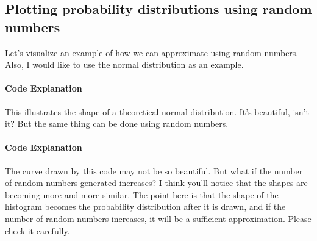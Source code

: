 \documentclass{ltjsbook}
\begin{document}
\subsection{Plotting probability distributions using random numbers}
Let's visualize an example of how we can approximate using random numbers. Also, I would like to use the normal distribution as an example.

\paragraph{Code Explanation}

This illustrates the shape of a theoretical normal distribution. It's beautiful, isn't it? But the same thing can be done using random numbers.


\paragraph{Code Explanation}

The curve drawn by this code may not be so beautiful. But what if the number of random numbers generated increases? I think you'll notice that the shapes are becoming more and more similar.
The point here is that the shape of the histogram becomes the probability distribution after it is drawn, and if the number of random numbers increases, it will be a sufficient approximation. Please check it carefully.

\end{document}

